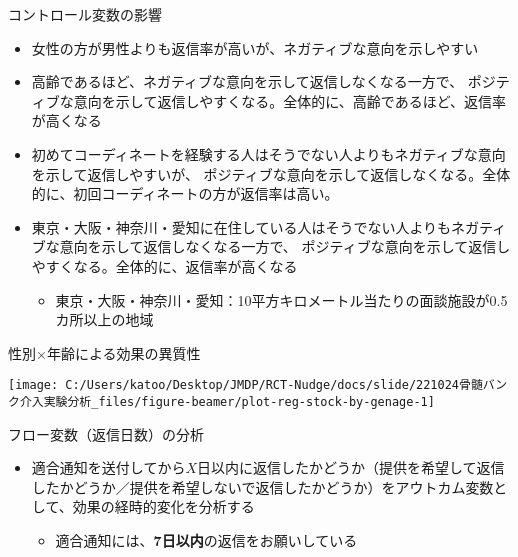 \documentclass[
      aspectratio=169,
        12pt,
    ]{beamer}
\renewcommand{\textbf}[1]{{\color{DarkBlue}\bfseries#1}}
\providecommand{\tightlist}{%
  \setlength{\itemsep}{0pt}\setlength{\parskip}{0pt}}
\begin{document}
\begin{frame}{コントロール変数の影響}
\protect\hypertarget{ux30b3ux30f3ux30c8ux30edux30fcux30ebux5909ux6570ux306eux5f71ux97ff}{}
\begin{itemize}
\tightlist
\item
  女性の方が男性よりも返信率が高いが、ネガティブな意向を示しやすい
\item
  高齢であるほど、ネガティブな意向を示して返信しなくなる一方で、
  ポジティブな意向を示して返信しやすくなる。全体的に、高齢であるほど、返信率が高くなる
\item
  初めてコーディネートを経験する人はそうでない人よりもネガティブな意向を示して返信しやすいが、
  ポジティブな意向を示して返信しなくなる。全体的に、初回コーディネートの方が返信率は高い。
\item
  東京・大阪・神奈川・愛知に在住している人はそうでない人よりもネガティブな意向を示して返信しなくなる一方で、
  ポジティブな意向を示して返信しやすくなる。全体的に、返信率が高くなる

  \begin{itemize}
  \tightlist
  \item
    東京・大阪・神奈川・愛知：10平方キロメートル当たりの面談施設が0.5カ所以上の地域
  \end{itemize}
\end{itemize}
\end{frame}

\begin{frame}{性別×年齢による効果の異質性}
\protect\hypertarget{ux6027ux5225ux5e74ux9f62ux306bux3088ux308bux52b9ux679cux306eux7570ux8ceaux6027}{}
\begin{center}\texttt{[image: C:/Users/katoo/Desktop/JMDP/RCT-Nudge/docs/slide/221024骨髄バンク介入実験分析\_files/figure-beamer/plot-reg-stock-by-genage-1]} \end{center}
\end{frame}

\begin{frame}{フロー変数（返信日数）の分析}
\protect\hypertarget{ux30d5ux30edux30fcux5909ux6570ux8fd4ux4fe1ux65e5ux6570ux306eux5206ux6790}{}
\begin{itemize}
\tightlist
\item
  適合通知を送付してから\(X\)日以内に返信したかどうか（提供を希望して返信したかどうか／提供を希望しないで返信したかどうか）をアウトカム変数として、効果の経時的変化を分析する

  \begin{itemize}
  \tightlist
  \item
    適合通知には、\textbf{7日以内}の返信をお願いしている
  \end{itemize}
\end{itemize}
\end{frame}
\end{document}
